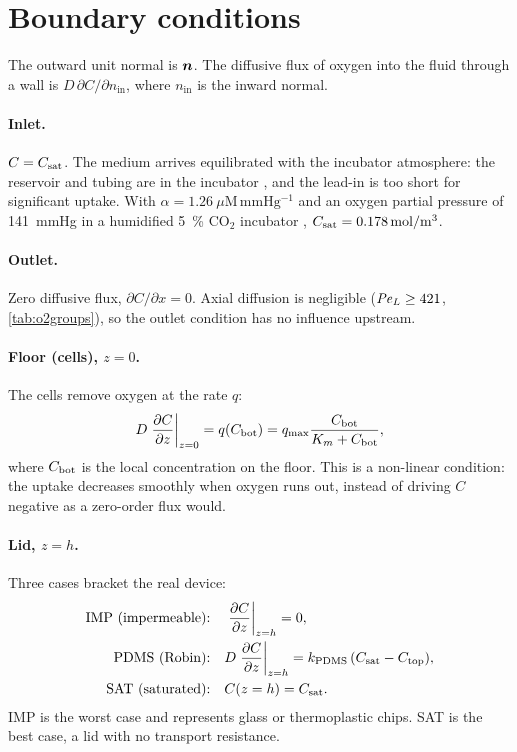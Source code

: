 \section{Boundary conditions}

The outward unit normal is $\bm{n}$. The diffusive flux of oxygen into the fluid through a wall is $D\,\partial C/\partial n_{\mathrm{in}}$, where $n_{\mathrm{in}}$ is the inward normal.

\paragraph{Inlet.} $C=C_{\mathrm{sat}}$. The medium arrives equilibrated with the incubator atmosphere: the reservoir and tubing are in the incubator \citep{Delon2020}, and the lead-in is too short for significant uptake. With $\alpha=1.26~\mu\mathrm{M\,mmHg^{-1}}$ and an oxygen partial pressure of \SI{141}{mmHg} in a humidified \SI{5}{\percent} CO$_2$ incubator \citep{Wenger2015}, $C_{\mathrm{sat}}=\SI{0.178}{mol/m^3}$.

\paragraph{Outlet.} Zero diffusive flux, $\partial C/\partial x=0$. Axial diffusion is negligible ($\mathit{Pe}_L\ge421$, \cref{tab:o2groups}), so the outlet condition has no influence upstream.

\paragraph{Floor (cells), $z=0$.} The cells remove oxygen at the rate $q$:
\begin{equation}
D\left.\frac{\partial C}{\partial z}\right|_{z=0}=q(C_{\mathrm{bot}})=q_{\max}\frac{C_{\mathrm{bot}}}{K_{m}+C_{\mathrm{bot}}},
\label{eq:ox_bc_floor}
\end{equation}
where $C_{\mathrm{bot}}$ is the local concentration on the floor. This is a non-linear condition: the uptake decreases smoothly when oxygen runs out, instead of driving $C$ negative as a zero-order flux would.

\paragraph{Lid, $z=h$.} Three cases bracket the real device:
\begin{align}
\text{IMP (impermeable):}&\quad \left.\frac{\partial C}{\partial z}\right|_{z=h}=0, \label{eq:ox_bc_imp}\\
\text{PDMS (Robin):}&\quad D\left.\frac{\partial C}{\partial z}\right|_{z=h}=k_{\mathrm{PDMS}}\,(C_{\mathrm{sat}}-C_{\mathrm{top}}), \label{eq:ox_bc_pdms}\\
\text{SAT (saturated):}&\quad C(z=h)=C_{\mathrm{sat}}. \label{eq:ox_bc_sat}
\end{align}
IMP is the worst case and represents glass or thermoplastic chips. SAT is the best case, a lid with no transport resistance.

